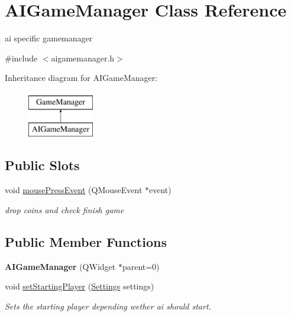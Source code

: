 \hypertarget{classAIGameManager}{\section{\-A\-I\-Game\-Manager \-Class \-Reference}
\label{classAIGameManager}
}


ai specific gamemanager  




{\ttfamily \#include $<$aigamemanager.\-h$>$}

\-Inheritance diagram for \-A\-I\-Game\-Manager\-:\begin{figure}[H]
\begin{center}
\leavevmode
\includegraphics[height=2.000000cm]{classAIGameManager}
\end{center}
\end{figure}
\subsection*{\-Public \-Slots}
\begin{DoxyCompactItemize}
\item 
\hypertarget{classAIGameManager_a1dd46d003522dfad3572c0de445d1d20}{void \hyperlink{classAIGameManager_a1dd46d003522dfad3572c0de445d1d20}{mouse\-Press\-Event} (\-Q\-Mouse\-Event $\ast$event)}\label{classAIGameManager_a1dd46d003522dfad3572c0de445d1d20}

\begin{DoxyCompactList}\small\item\em drop coins and check finish game \end{DoxyCompactList}\end{DoxyCompactItemize}
\subsection*{\-Public \-Member \-Functions}
\begin{DoxyCompactItemize}
\item 
\hypertarget{classAIGameManager_a488945627859aff9401f1280f123bdc4}{{\bfseries \-A\-I\-Game\-Manager} (\-Q\-Widget $\ast$parent=0)}\label{classAIGameManager_a488945627859aff9401f1280f123bdc4}

\item 
\hypertarget{classAIGameManager_a91068d6c5076821cd5361efdbbc68fef}{void \hyperlink{classAIGameManager_a91068d6c5076821cd5361efdbbc68fef}{set\-Starting\-Player} (\hyperlink{structSettings}{\-Settings} settings)}\label{classAIGameManager_a91068d6c5076821cd5361efdbbc68fef}

\begin{DoxyCompactList}\small\item\em \-Sets the starting player depending wether ai should start. \end{DoxyCompactList}\end{DoxyCompactItemize}


